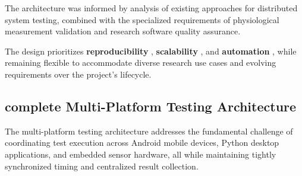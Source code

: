 {{{The architecture was informed by analysis of existing approaches for distributed system testing, combined with the specialized requirements of physiological measurement validation and research software quality assurance.

The design prioritizes \textbf{reproducibility}
, \textbf{scalability}
, and \textbf{automation}
, while remaining flexible to accommodate diverse research use cases and evolving requirements over the project's lifecycle.

\subsection{complete Multi-Platform Testing Architecture}

The multi-platform testing architecture addresses the fundamental challenge of coordinating test execution across Android mobile devices, Python desktop applications, and embedded sensor hardware, all while maintaining tightly synchronized timing and centralized result collection.

}}}
